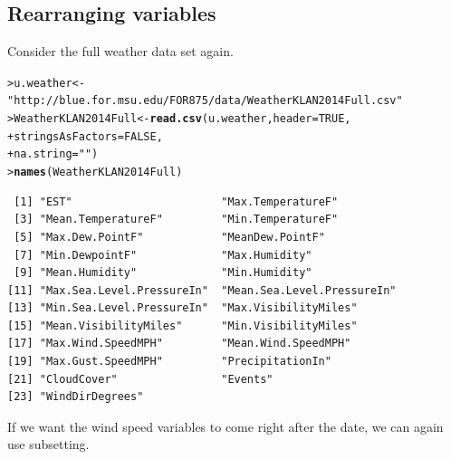 \documentclass[12pt,oneside]{book}\usepackage[]{graphicx}\usepackage[]{color}
\makeatletter
\newcommand{\hlnum}[1]{\textcolor[rgb]{0.686,0.059,0.569}{#1}}%
\newcommand{\hlstr}[1]{\textcolor[rgb]{0.192,0.494,0.8}{#1}}%
\newcommand{\hlstd}[1]{\textcolor[rgb]{0.345,0.345,0.345}{#1}}%
\newcommand{\hlkwb}[1]{\textcolor[rgb]{0.69,0.353,0.396}{#1}}%
\newcommand{\hlkwc}[1]{\textcolor[rgb]{0.333,0.667,0.333}{#1}}%
\newcommand{\hlkwd}[1]{\textcolor[rgb]{0.737,0.353,0.396}{\textbf{#1}}}%
\newenvironment{kframe}{%
 \def\at@end@of@kframe{}%
 \ifinner\ifhmode%
  \def\at@end@of@kframe{\end{minipage}}%
  \begin{minipage}{\columnwidth}%
 \fi\fi%
 \def\FrameCommand##1{\hskip\@totalleftmargin \hskip-\fboxsep
 \colorbox{shadecolor}{##1}\hskip-\fboxsep
     \hskip-\linewidth \hskip-\@totalleftmargin \hskip\columnwidth}%
 \MakeFramed {\advance\hsize-\width
   \@totalleftmargin\z@ \linewidth\hsize
   \@setminipage}}%
 {\par\unskip\endMakeFramed%
 \at@end@of@kframe}
\newenvironment{knitrout}{}{} %
\makeatother
\begin{document}
\subsection{Rearranging variables}
Consider the full weather data set again. 
\begin{knitrout}
\color{fgcolor}\begin{kframe}
\begin{alltt}
\hlstd{> }\hlstd{u.weather} \hlkwb{<-} \hlstr{"http://blue.for.msu.edu/FOR875/data/WeatherKLAN2014Full.csv"}
\hlstd{> }\hlstd{WeatherKLAN2014Full} \hlkwb{<-} \hlkwd{read.csv}\hlstd{(u.weather,} \hlkwc{header}\hlstd{=}\hlnum{TRUE}\hlstd{,}
\hlstd{+ }                                \hlkwc{stringsAsFactors} \hlstd{=} \hlnum{FALSE}\hlstd{,}
\hlstd{+ }                                \hlkwc{na.string} \hlstd{=} \hlstr{""}\hlstd{)}
\hlstd{> }\hlkwd{names}\hlstd{(WeatherKLAN2014Full)}
\end{alltt}
\begin{verbatim}
 [1] "EST"                       "Max.TemperatureF"         
 [3] "Mean.TemperatureF"         "Min.TemperatureF"         
 [5] "Max.Dew.PointF"            "MeanDew.PointF"           
 [7] "Min.DewpointF"             "Max.Humidity"             
 [9] "Mean.Humidity"             "Min.Humidity"             
[11] "Max.Sea.Level.PressureIn"  "Mean.Sea.Level.PressureIn"
[13] "Min.Sea.Level.PressureIn"  "Max.VisibilityMiles"      
[15] "Mean.VisibilityMiles"      "Min.VisibilityMiles"      
[17] "Max.Wind.SpeedMPH"         "Mean.Wind.SpeedMPH"       
[19] "Max.Gust.SpeedMPH"         "PrecipitationIn"          
[21] "CloudCover"                "Events"                   
[23] "WindDirDegrees"           
\end{verbatim}
\end{kframe}
\end{knitrout}
If we want the wind speed variables to come right after the date, we can again use subsetting.
\end{document}
